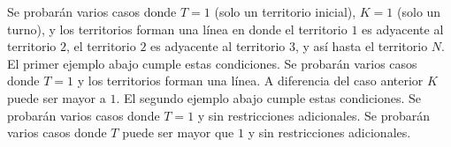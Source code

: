 \documentclass{oci}
\begin{document}
\begin{scoreDescription}
   Se probarán varios casos donde $T=1$ (solo un territorio inicial), $K=1$ (solo un turno), y los 
  territorios forman una línea en donde el territorio $1$ es adyacente al territorio $2$, 
  el territorio $2$ es adyacente al territorio $3$, y así hasta el territorio $N$.
  El primer ejemplo abajo cumple estas condiciones.
   Se probarán varios casos donde $T=1$ y los territorios forman una línea.
  A diferencia del caso anterior $K$ puede ser mayor a $1$.
  El segundo ejemplo abajo cumple estas condiciones.
   Se probarán varios casos donde $T=1$ y sin
  restricciones adicionales.
   Se probarán varios casos donde $T$ puede ser mayor que $1$ y sin restricciones
  adicionales.
\end{scoreDescription}

\begin{sampleDescription}
\end{sampleDescription}
\end{document}
